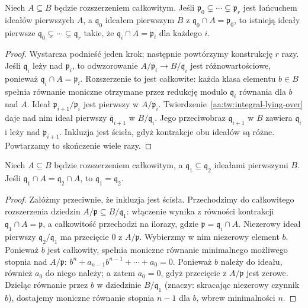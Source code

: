 \begin{twierdzenie}\label{aa:tw:integral-going-up}
Niech $A\subseteq B$ będzie rozszerzeniem całkowitym.
Jeśli $\mathfrak p_0\subsetneq\cdots\subsetneq\mathfrak p_r$
jest łańcuchem ideałów pierwszych $A$, a
$\mathfrak q_0$ ideałem pierwszym $B$ z
$\mathfrak q_0\cap A=\mathfrak p_0$, to istnieją ideały pierwsze
$\mathfrak q_0\subsetneq\cdots\subsetneq\mathfrak q_r$
takie, że $\mathfrak q_i\cap A=\mathfrak p_i$ dla każdego $i$.
\end{twierdzenie}
\begin{proof}
Wystarcza podnieść jeden krok; następnie powtórzymy
konstrukcję $r$ razy. Jeśli $\mathfrak q_i$ leży
nad $\mathfrak p_i$, to odwzorowanie
$A/\mathfrak p_i\to B/\mathfrak q_i$ jest
różnowartościowe, ponieważ
$\mathfrak q_i\cap A=\mathfrak p_i$.
Rozszerzenie to jest całkowite: każda klasa elementu $b\in B$
spełnia równanie moniczne otrzymane przez redukcję modulo
$\mathfrak q_i$ równania dla $b$ nad $A$.
Ideał $\mathfrak p_{i+1}/\mathfrak p_i$ jest pierwszy
w $A/\mathfrak p_i$. Twierdzenie~\ref{aa:tw:integral-lying-over}
daje nad nim ideał pierwszy $\overline{\mathfrak q}_{i+1}$
w $B/\mathfrak q_i$. Jego przeciwobraz $\mathfrak q_{i+1}$
w $B$ zawiera $\mathfrak q_i$ i leży nad
$\mathfrak p_{i+1}$. Inkluzja jest ścisła, gdyż kontrakcje
obu ideałów są różne. Powtarzamy to skończenie wiele razy.
\end{proof}

\begin{twierdzenie}\label{aa:tw:integral-incomparability}
Niech $A\subseteq B$ będzie rozszerzeniem całkowitym,
a $\mathfrak q_1\subseteq\mathfrak q_2$ ideałami pierwszymi $B$.
Jeśli $\mathfrak q_1\cap A=\mathfrak q_2\cap A$, to
$\mathfrak q_1=\mathfrak q_2$.
\end{twierdzenie}
\begin{proof}
Załóżmy przeciwnie, że inkluzja jest ścisła.
Przechodzimy do całkowitego rozszerzenia dziedzin
$A/\mathfrak p\subseteq B/\mathfrak q_1$: włączenie
wynika z równości kontrakcji $\mathfrak q_1\cap A
=\mathfrak p$, a całkowitość przechodzi na ilorazy, gdzie
$\mathfrak p=\mathfrak q_i\cap A$.
Niezerowy ideał pierwszy $\mathfrak q_2/\mathfrak q_1$
ma przecięcie $0$ z $A/\mathfrak p$.
Wybierzmy w nim niezerowy element $b$. Ponieważ $b$ jest
całkowity, spełnia moniczne równanie minimalnego możliwego
stopnia nad $A/\mathfrak p$:
$b^n+a_{n-1}b^{n-1}+\cdots+a_0=0$.
Ponieważ $b$ należy do ideału, również $a_0$ do niego należy;
a zatem $a_0=0$, gdyż przecięcie z $A/\mathfrak p$ jest zerowe.
Dzieląc równanie przez $b$ w dziedzinie $B/\mathfrak q_1$
(znaczy: skracając niezerowy czynnik $b$), dostajemy moniczne
równanie stopnia $n-1$ dla $b$, wbrew minimalności $n$.
\end{proof}

